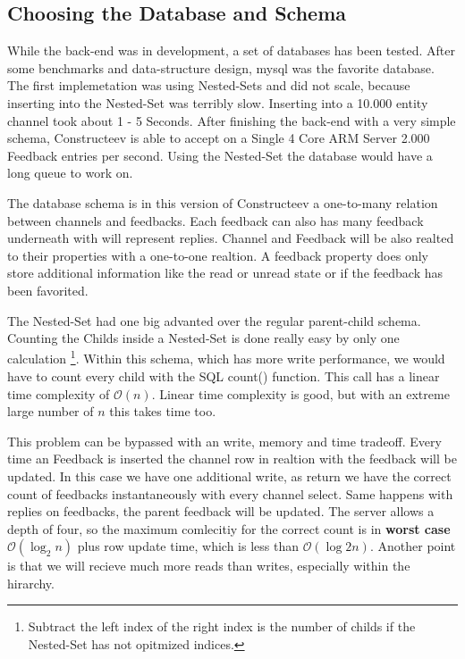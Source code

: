 \subsection{Choosing the Database and Schema}
\textcolor{newcode}{While the back-end was in development, a set of databases has been tested. After some benchmarks and data-structure design, mysql was the favorite database. The first implemetation was using Nested-Sets and did not scale, because inserting into the Nested-Set was terribly slow. Inserting into a 10.000 entity channel took about 1 - 5 Seconds. After finishing the back-end with a very simple schema, Constructeev is able to accept on a Single 4 Core ARM Server 2.000 Feedback entries per second. Using the Nested-Set the database would have a long queue to work on.}

\textcolor{newcode}{The database schema is in this version of Constructeev a one-to-many relation between channels and feedbacks. Each feedback can also has many feedback underneath with will represent replies. Channel and Feedback will be also realted to their properties with a one-to-one realtion. A feedback property does only store additional information like the read or unread state or if the feedback has been favorited.}

\textcolor{newcode}{The Nested-Set had one big advanted over the regular parent-child schema. Counting the Childs inside a Nested-Set is done really easy by only one calculation \footnote{Subtract the left index of the right index is the number of childs if the Nested-Set has not opitmized indices.}. Within this schema, which has more write performance, we would have to count every child with the SQL count() function. This call has a linear time complexity of $\mathcal{O}(n)$. Linear time complexity is good, but with an extreme large number of $n$ this takes time too.}

\textcolor{newcode}{
This problem can be bypassed with an write, memory and time tradeoff. Every time an Feedback is inserted the channel row in realtion with the feedback will be updated. In this case we have one additional write, as return we have the correct count of feedbacks instantaneously with every channel select.
Same happens with replies on feedbacks, the parent feedback will be updated. The server allows a depth of four, so the maximum comlecitiy for the correct count is in \textbf{worst case} $\mathcal{O}(\log _2 {n})$ plus row update time, which is less than $\mathcal{O}(\log{2}{n})$. Another point is that we will recieve much more reads than writes, especially within the hirarchy.}
	
